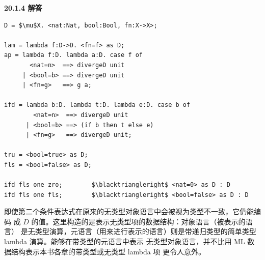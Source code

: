 \begin{taplauthorsolutionentrybox}
\label{sol:author:20.1.4}
\textbf{20.1.4 解答}

\begin{lstlisting}[mathescape=true]
D = $\mu$X. <nat:Nat, bool:Bool, fn:X->X>;

lam = lambda f:D->D. <fn=f> as D;
ap = lambda f:D. lambda a:D. case f of
       <nat=n>  ==> divergeD unit
     | <bool=b> ==> divergeD unit
     | <fn=g>   ==> g a;

ifd = lambda b:D. lambda t:D. lambda e:D. case b of
        <nat=n>  ==> divergeD unit
      | <bool=b> ==> (if b then t else e)
      | <fn=g>   ==> divergeD unit;

tru = <bool=true> as D;
fls = <bool=false> as D;

ifd fls one zro;        $\blacktriangleright$ <nat=0> as D : D
ifd fls one fls;        $\blacktriangleright$ <bool=false> as D : D
\end{lstlisting}

即使第二个条件表达式在原来的无类型对象语言中会被视为类型不一致，它仍能编码
成 \(D\) 的值。这里构造的是表示无类型项的数据结构：对象语言（被表示的语言）
是无类型演算，元语言（用来进行表示的语言）则是带递归类型的简单类型 lambda
演算。能够在带类型的元语言中表示
无类型对象语言，并不比用 ML 数据结构表示本书各章的带类型或无类型 lambda 项
更令人意外。

\end{taplauthorsolutionentrybox}

